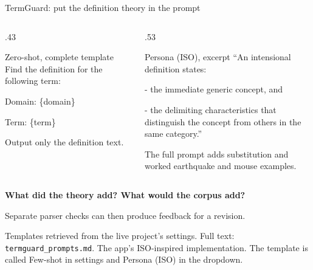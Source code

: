 \documentclass[aspectratio=169,10pt]{beamer}
\newcommand{\key}[1]{\textcolor{aegean}{\textbf{#1}}}
\newcommand{\source}[1]{\vfill{\scriptsize\color{slate}#1\par}}
\newcommand{\question}[1]{\medskip\par\key{#1}\par}
\begin{document}
\begin{frame}{TermGuard: put the definition theory in the prompt}
  \begin{columns}[T]
    \begin{column}{.43\textwidth}
      \begin{block}{Zero-shot, complete template}
        \small
        Find the definition for the following term:\par
        Domain: \{domain\}\par
        Term: \{term\}\par
        Output only the definition text.
      \end{block}
    \end{column}
    \begin{column}{.53\textwidth}
      \begin{block}{Persona (ISO), excerpt}
        \small
        “An intensional definition states:\par
        - the immediate generic concept, and\par
        - the delimiting characteristics that distinguish the concept from others in the same category.”
      \end{block}
      \small The full prompt adds substitution and worked earthquake and mouse examples.
    \end{column}
  \end{columns}
  \question{What did the theory add? What would the corpus add?}
  \small Separate parser checks can then produce feedback for a revision.
  \source{Templates retrieved from the live project's settings. Full text: \texttt{termguard\_prompts.md}.\newline
  The app's ISO-inspired implementation. The template is called Few-shot in settings and Persona (ISO) in the dropdown.}
\end{frame}
\end{document}

